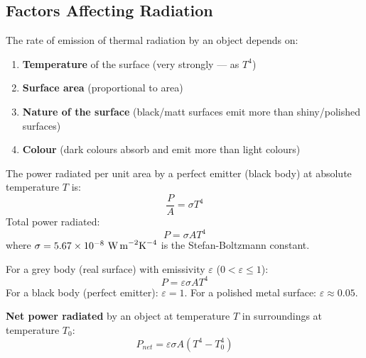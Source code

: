 \begin{diagbox}
\begin{center}
\end{center}
\end{diagbox}

\subsection{Factors Affecting Radiation}

The rate of emission of thermal radiation by an
object depends on:
\begin{enumerate}[noitemsep]
  \item \textbf{Temperature} of the surface
  (very strongly --- as $T^4$)
  \item \textbf{Surface area} (proportional to area)
  \item \textbf{Nature of the surface} (black/matt
  surfaces emit more than shiny/polished surfaces)
  \item \textbf{Colour} (dark colours absorb and emit
  more than light colours)
\end{enumerate}

\begin{lawbox}
The power radiated per unit area by a perfect emitter
(black body) at absolute temperature $T$ is:
\[
  \frac{P}{A} = \sigma T^4
\]
Total power radiated:
\[
  P = \sigma A T^4
\]
where $\sigma = 5.67\times10^{-8}\ \text{W\,m}^{-2}\text{K}^{-4}$
is the Stefan-Boltzmann constant.

For a grey body (real surface) with emissivity
$\varepsilon$ ($0 < \varepsilon \leq 1$):
\[
  P = \varepsilon\sigma A T^4
\]
For a black body (perfect emitter): $\varepsilon = 1$.
For a polished metal surface: $\varepsilon \approx 0.05$.

\textbf{Net power radiated} by an object at
temperature $T$ in surroundings at temperature
$T_0$:
\[
  P_{net} = \varepsilon\sigma A(T^4 - T_0^4)
\]
\end{lawbox}

